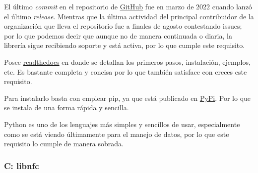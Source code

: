\begin{todolist}
    \item [\xcmark] El último \emph{commit} en el repositorio de
    \href{https://github.com/nfcpy/nfcpy}{GitHub} fue en marzo de 2022 cuando
    lanzó el último \emph{release}. Mientras que la última actividad del principal
    contribuidor de la organización que lleva el repositorio fue a finales de
    agosto contestando issues; por lo que podemos decir que aunque no de manera
    continuada o diaria, la librería sigue recibiendo soporte y está activa, por
    lo que cumple este requisito.
    \item [\xcmark] Posee
    \href{https://nfcpy.readthedocs.io/en/latest/index.html}{readthedocs} en
    donde se detallan los primeros pasos, instalación, ejemplos, etc. Es
    bastante completa y concisa por lo que también satisface con creces este
    requisito.
    \item [\xcmark] Para instalarlo basta con emplear pip, ya que está publicado en
    \href{https://pypi.org/project/nfcpy/}{PyPi}. Por lo que se instala de una
    forma rápida y sencilla.
    \item[\xcmark] Python es uno de los lenguajes más simples y sencillos de
    usar, especialmente como se está viendo últimamente para el manejo de datos,
    por lo que este requisito lo cumple de manera sobrada.
\end{todolist}

\subsubsection{C: libnfc}

